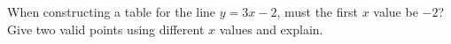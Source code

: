 When constructing a table for the line $y=3x-2$, must the first $x$ value be $-2$? Give two valid points using different $x$ values and explain.
